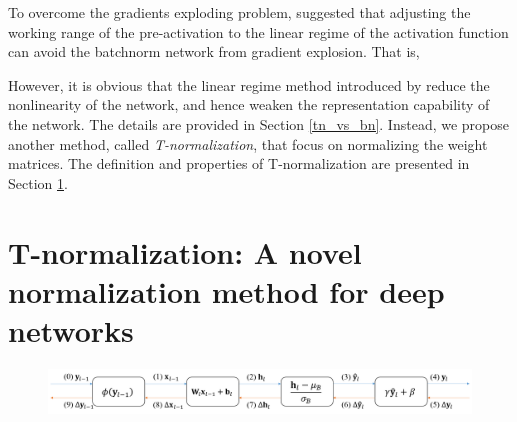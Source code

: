 To overcome the gradients exploding problem, \cite{mft:bn} suggested that adjusting the working
range of the pre-activation to the linear regime of the activation function can avoid the batchnorm
network from gradient explosion.
That is,

However, it is obvious that the linear regime method introduced by \cite{mft:bn} reduce the
nonlinearity of the network, and hence weaken the representation capability of the network.
The details are provided in Section \ref{tn_vs_bn}.
Instead, we propose another method, called \textit{T-normalization}, that focus on normalizing the
weight matrices. The definition and properties of T-normalization are presented in Section
\ref{comp:tn}.


\section{T-normalization: A novel normalization method for deep networks} \label{comp:tn}



\begin{figure}[h]
    \centering
    \newcommand{\myWidth}{0.90\textwidth}
    \centering
    \includegraphics[width=1.0\linewidth]{img/TNorm/batchnorm}
    \caption[The information propagation of batchnorm]{
    }
    \label{fig:batchnorm_propagation}
\end{figure}

\fi
